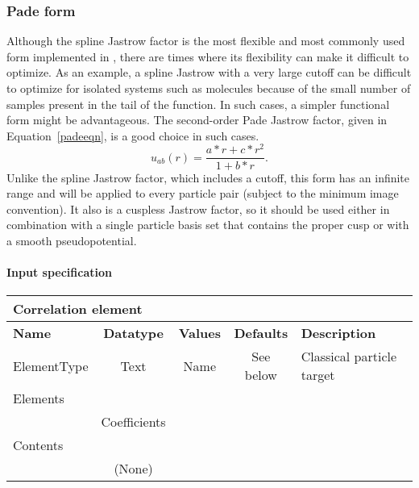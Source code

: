 \subsubsection{Pade form}
\label{sec:onebodyjastrowpade}

Although the spline Jastrow factor is the most flexible and most commonly used form implemented in \qmcpack, 
there are times where its flexibility can make it difficult to optimize.  As an example, a spline Jastrow
with a very large cutoff can be difficult to optimize for isolated systems such as molecules because of the small
number of samples present in the tail of the function.  In such cases, a simpler functional
form might be advantageous.  The second-order Pade Jastrow factor, given in Equation~\ref{padeeqn}, is a good choice 
in such cases.  
\begin{equation}
\label{padeeqn}
u_{ab}(r) = \frac{a*r+c*r^2}{1+b*r} .
\end{equation}
Unlike the spline Jastrow factor, which includes a cutoff, this form has an infinite range and will be applied to every particle
pair (subject to the minimum image convention).  It also is a cuspless Jastrow factor,
so it should be used either in combination with a single particle basis set that contains the proper cusp or
with a smooth pseudopotential.

\paragraph{Input specification}
\begin{table}[h]
\begin{center}
\begin{tabular}{l c c c l }
\hline
\multicolumn{5}{l}{Correlation element} \\
\hline
\bfseries Name & \bfseries Datatype & \bfseries Values & \bfseries Defaults & \bfseries Description \\
\hline
ElementType & Text & Name & See below & Classical particle target  \\
\hline
\multicolumn{5}{l}{Elements}\\ \hline
& Coefficients & & & \\ \hline
\multicolumn{5}{l}{Contents}\\ \hline
& (None)  & & &  \\ \hline
\end{tabular}
\end{center}
\end{table}


